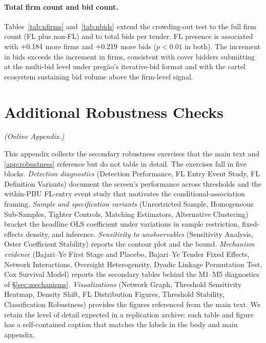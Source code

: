 

\paragraph{Total firm count and bid count.}
Tables~\ref{tab:nfirms} and~\ref{tab:nbids} extend the
crowding-out test to the full firm count (FL plus non-FL) and
to total bids per tender. FL presence is associated with
$+0.184$ more firms and $+0.219$ more bids ($p < 0.01$ in
both). The increment in bids exceeds the increment in firms,
consistent with cover bidders submitting at the
multi-bid level under preg\~ao's iterative-bid format and
with the cartel ecosystem sustaining bid volume above the
firm-level signal.





\section{Additional Robustness Checks}
\label{app:online_robustness}
\noindent\textit{(Online Appendix.)}\medskip

This appendix collects the secondary robustness exercises that
the main text and \ref{app:robustness} reference but do not
table in detail. The exercises fall in five blocks. \emph{Detection
diagnostics} (Detection Performance, FL Entry Event Study,
FL Definition Variants) document the screen's performance
across thresholds and the within-PBU FL-entry event study that
motivates the conditional-association framing.
\emph{Sample and specification variants} (Unrestricted Sample,
Homogeneous Sub-Samples, Tighter Controls, Matching Estimators,
Alternative Clustering) bracket the headline OLS coefficient
under variations in sample restriction, fixed-effects density,
and inference. \emph{Sensitivity to unobservables} (Sensitivity
Analysis, Oster Coefficient Stability) reports the
\citet{cinelli2020making} contour plot and the
\citet{oster2019unobservable} bound. \emph{Mechanism evidence}
(Bajari--Ye First Stage and Placebo, Bajari--Ye Tender Fixed
Effects, Network Interactions, Oversight Heterogeneity, Dyadic
Linkage Permutation Test, Cox Survival Model) reports the
secondary tables behind the M1--M5 diagnostics of
\S\ref{sec:mechanisms}. \emph{Visualizations} (Network Graph,
Threshold Sensitivity Heatmap, Density Shift, FL Distribution
Figures, Threshold Stability, Classification Robustness)
provides the figures referenced from the main text. We retain
the level of detail expected in a replication archive: each
table and figure has a self-contained caption that matches the
labels in the body and main appendix.

